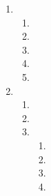 \begin{enumerate}
\begin{enumerate}
      \item 

      \item 

      \item 

      \item 

      \item 

    \end{enumerate}

  \item

    \begin{enumerate}

      \item 

      \item 

      \item 

      \item 

      \item 

    \end{enumerate}

    \setcounter{enumi}{5}

  \item

    \begin{enumerate}

      \item 

      \item 

      \item 

        \begin{enumerate}

          \item 

          \item 

          \item 

          \item 

        \end{enumerate}

    \end{enumerate}

    \setcounter{enumi}{7}


\end{enumerate}
